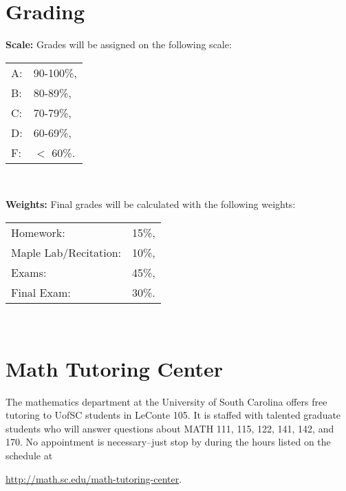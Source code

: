 \documentclass[10pt]{amsart}
\begin{document}
\section*{Grading}
\noindent\textbf{Scale:}
Grades will be assigned on the following scale:
\begin{center}
  \begin{tabular}{ll}
    A: &90-100\%,\\
    B: & 80-89\%,\\
    C: & 70-79\%,\\
    D: & 60-69\%,\\
    F: & $<$ 60\%.\\
  \end{tabular}\\
\end{center}
\textbf{Weights:}
Final grades will be calculated with the following weights:
\begin{center}
  \begin{tabular}{lr}
    Homework: & 15\%,\\
    Maple Lab/Recitation: &10\%,\\
    Exams: & 45\%,\\
    Final Exam: & 30\%.\\
  \end{tabular}\\
\end{center}

\section*{Math Tutoring Center}
\noindent
The mathematics department at the University of South Carolina offers free tutoring to UofSC students in LeConte 105.
It is staffed with talented graduate students who will answer questions about MATH 111, 115, 122, 141, 142, and 170.
No appointment is necessary--just stop by during the hours listed on the schedule at
\begin{center}
  \url{http://math.sc.edu/math-tutoring-center}.
\end{center}
\end{document}
